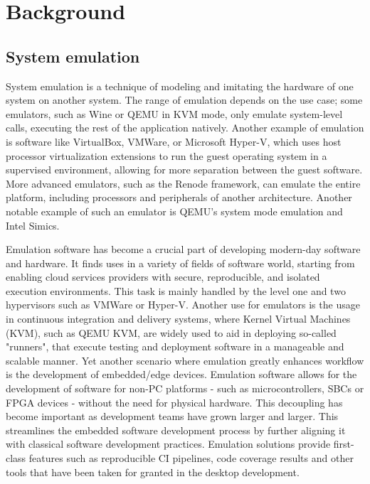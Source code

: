 
\chapter{Background}


\section{System emulation}

System emulation is a technique of modeling and imitating the hardware of one
system on another system. The range of emulation depends on the use case; some
emulators, such as Wine or QEMU in KVM mode, only emulate system-level calls,
executing the rest of the application natively. Another example of emulation
is software like VirtualBox, VMWare, or Microsoft Hyper-V, which uses host
processor virtualization extensions to run the guest operating system in a
supervised environment, allowing for more separation between the guest software.
More advanced emulators, such as the Renode framework, can emulate the entire
platform, including processors and peripherals of another architecture. Another
notable example of such an emulator is QEMU's system mode emulation and Intel
Simics.

Emulation software has become a crucial part of developing modern-day software
and hardware. It finds uses in a variety of fields of software world, starting
from enabling cloud services providers with secure, reproducible, and isolated
execution environments. This task is mainly handled by the level one and
two hypervisors such as VMWare or Hyper-V. Another use for emulators is the
usage in continuous integration and delivery systems, where Kernel Virtual
Machines (KVM), such as QEMU KVM, are widely used to aid in deploying so-called
"runners", that execute testing and deployment software in a manageable and
scalable manner. Yet another scenario where emulation greatly enhances workflow
is the development of embedded/edge devices. Emulation software allows for
the development of software for non-PC platforms - such as microcontrollers,
SBCs or FPGA devices - without the need for physical hardware. This decoupling
has become important as development teams have grown larger and larger. This
streamlines the embedded software development process by further aligning it
with classical software development practices. Emulation solutions provide
first-class features such as reproducible CI pipelines, code coverage results
and other tools that have been taken for granted in the desktop development.


